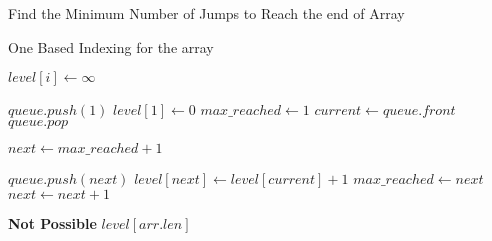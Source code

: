 \documentclass[12pt]{article}
\begin{document}
\section*{}

\begin{algorithm}

  \caption{Find the Minimum Number of Jumps to Reach the end of Array}
  
  \begin{algorithmic}[1]
    \Ensure One Based Indexing for the array
    \Statex
    
    
            \State $level[i] \gets \infty$
        \EndFor
        
        \State $queue.push(1)$
        \State $level[1] \gets 0$
        \State $max\_reached \gets 1$ 
            \State $current \gets queue.front$
            \State $queue.pop$
            
            \State $next \gets max\_reached + 1$
            
                \State $queue.push(next)$
                \State $level[next] \gets level[current] + 1$
                \State $max\_reached \gets next$
                \State $next \gets next + 1$
            \EndWhile
        \EndWhile
        
        \Statex
            \State \textbf{Not Possible}
        \Else
            \State \Return $level[arr.len]$
        \EndIf
        
    \EndFunction
  \end{algorithmic}
  
\end{algorithm}
\end{document}
